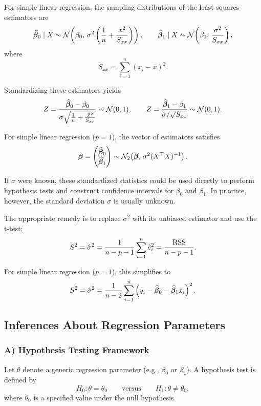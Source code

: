 For simple linear regression, the sampling distributions of the least squares estimators are
\[
\widehat{\boldsymbol{\beta}}_0 \mid X
\sim
\mathcal{N}
\!\left(
\beta_0,\,
\sigma^2
\left(
\frac{1}{n}
+
\frac{\bar{x}^2}{S_{xx}}
\right)
\right),
\qquad
\widehat{\boldsymbol{\beta}}_1 \mid X
\sim
\mathcal{N}
\!\left(
\beta_1,\,
\frac{\sigma^2}{S_{xx}}
\right),
\]
where
\[
S_{xx} = \sum_{i=1}^n (x_i - \bar{x})^2.
\]

Standardizing these estimators yields
\[
Z
=
\frac{\widehat{\boldsymbol{\beta}}_0 - \beta_0}
{\sigma \sqrt{\frac{1}{n} + \frac{\bar{x}^2}{S_{xx}}}}
\sim \mathcal{N}(0,1),
\qquad
Z
=
\frac{\widehat{\boldsymbol{\beta}}_1 - \beta_1}
{\sigma / \sqrt{S_{xx}}}
\sim \mathcal{N}(0,1).
\]

For simple linear regression ($p = 1$), the vector of estimators satisfies
\[
\boldsymbol{\beta}
=
\begin{pmatrix}
\widehat{\boldsymbol{\beta}}_0 \\
\widehat{\boldsymbol{\beta}}_1
\end{pmatrix}
\sim
\mathcal{N}_2
\!\left(
\boldsymbol{\beta},\,
\sigma^2 (X^\top X)^{-1}
\right).
\]

If $\sigma$ were known, these standardized statistics could be used directly to perform hypothesis tests and construct confidence intervals for $\beta_0$ and $\beta_1$. In practice, however, the standard deviation $\sigma$ is usually unknown.

The appropriate remedy is to replace $\sigma^2$ with its unbiased estimator and use the t-test:
\[
S^2
=
\hat{\sigma}^2
=
\frac{1}{n - p - 1}
\sum_{i=1}^n \hat{e}_i^2
=
\frac{\mathrm{RSS}}{n - p - 1}.
\]

For simple linear regression ($p = 1$), this simplifies to
\[
S^2
=
\hat{\sigma}^2
=
\frac{1}{n - 2}
\sum_{i=1}^n
\left(
y_i - \widehat{\boldsymbol{\beta}}_0 - \widehat{\boldsymbol{\beta}}_1 x_i
\right)^2.
\]

\subsection{Inferences About Regression Parameters}

\subsubsection{A) Hypothesis Testing Framework}

Let $\theta$ denote a generic regression parameter (e.g., $\beta_0$ or $\beta_1$). A hypothesis test is defined by
\[
H_0 : \theta = \theta_0
\qquad \text{versus} \qquad
H_1 : \theta \neq \theta_0,
\]
where $\theta_0$ is a specified value under the null hypothesis.

